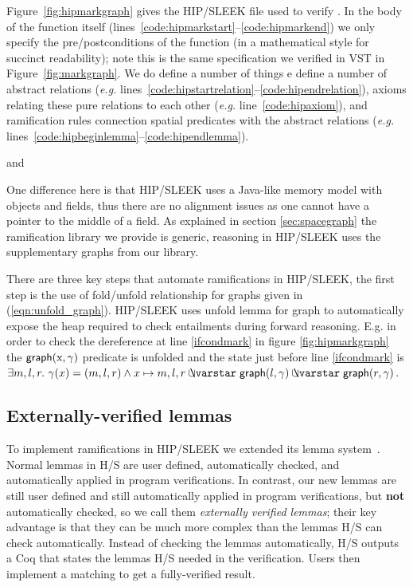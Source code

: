 Figure~\ref{fig:hipmarkgraph} gives the HIP/SLEEK file used to verify .  In the body of the function itself (lines~\ref{code:hipmarkstart}--\ref{code:hipmarkend}) we only specify the pre/postconditions of the function (in a mathematical style for succinct readability); note this is the same specification we verified in VST in Figure~\ref{fig:markgraph}.  We do define a number of things e define a number of abstract relations (\emph{e.g.} lines~\ref{code:hipstartrelation}--\ref{code:hipendrelation}), axioms relating these pure relations to each other (\emph{e.g.} line~\ref{code:hipaxiom}), and ramification rules connection spatial predicates with the abstract relations (\emph{e.g.} lines~\ref{code:hipbeginlemma}--\ref{code:hipendlemma}).



and 


One difference here is that HIP/SLEEK uses a Java-like memory model with objects and fields, thus there are no alignment issues as one cannot have a pointer to the middle of a field. As explained in section \ref{sec:spacegraph} the ramification library we provide is generic, reasoning in HIP/SLEEK uses the supplementary graphs from our library.

There are three key steps that automate ramifications in HIP/SLEEK, the first step is the use of fold/unfold relationship for graphs given in (\ref{eqn:unfold_graph}). HIP/SLEEK uses unfold lemma for graph to automatically expose the heap required to check entailments during forward reasoning. E.g. in order to check the dereference at line \ref{ifcondmark} in figure \ref{fig:hipmarkgraph} the $\mathsf{graph}(\text{x},\gamma)$ predicate is unfolded and the state just before line \ref{ifcondmark} is $ \exists m,l,r.~ \gamma(x)=(m,l,r) \wedge x \mapsto m,l,r \ocon \p{graph}(l, \gamma) \ocon \p{graph}(r, \gamma)$.

\subsection{Externally-verified lemmas}

To implement ramifications in HIP/SLEEK we extended its lemma system~\cite{NguyenC08}.
Normal lemmas in H/S are user defined, automatically checked, and automatically
applied in program verifications.  In contrast, our new lemmas are still user defined and still automatically applied in program verifications, but \textbf{not} automatically checked, so we call them \emph{externally verified lemmas}; their key advantage is that they can be much more complex than the lemmas H/S can check automatically.  Instead of checking the lemmas automatically, H/S outputs a Coq   that states the lemmas H/S needed in the verification.  Users then implement a matching  to get a fully-verified result.


